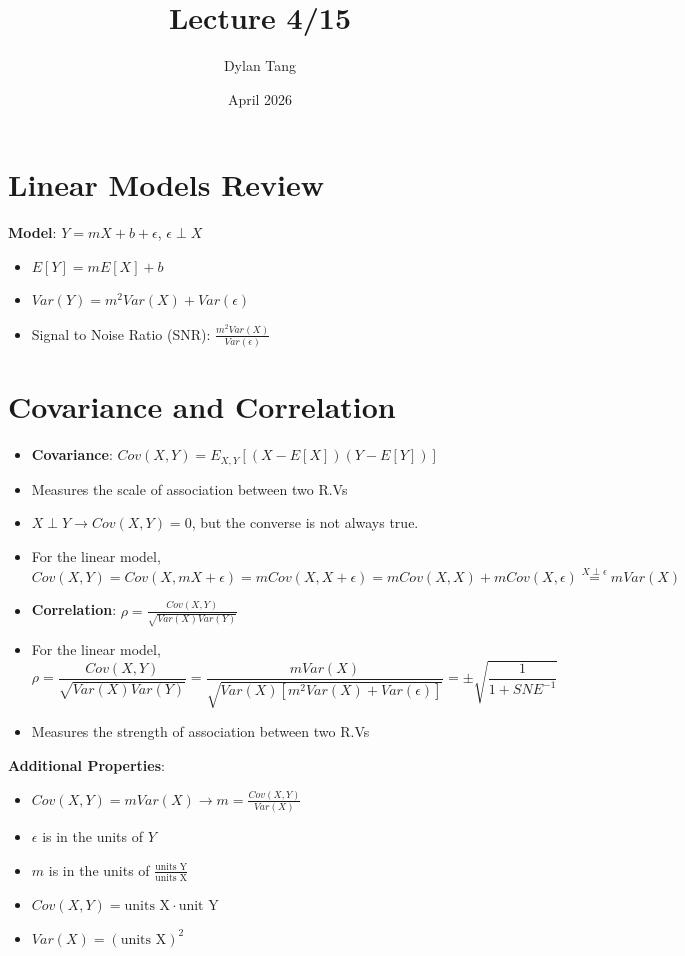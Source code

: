 \documentclass{article}
\title{Lecture 4/15}
\author{Dylan Tang}
\date{April 2026}
\begin{document}
\maketitle

\section{Linear Models Review}
\textbf{Model}: $Y = mX + b + \epsilon$, $\epsilon \perp X$
\begin{itemize}
\item $E[Y] = mE[X] + b$
\item $Var(Y) = m^2Var(X) + Var(\epsilon)$
\item Signal to Noise Ratio (SNR): $\frac{m^2Var(X)}{Var(\epsilon)}$
\end{itemize}
\section{Covariance and Correlation}
\begin{itemize}
    \item \textbf{Covariance}: $Cov(X,Y) = E_{X,Y}[(X - E[X])(Y - E[Y])]$
    \item Measures the scale of association between two R.Vs
    \item $X \perp Y \rightarrow Cov(X,Y) = 0$, but the converse is not always true.
    \item For the linear model, $Cov(X,Y) = Cov(X, mX + \epsilon) = mCov(X, X + \epsilon) = mCov(X,X) + mCov(X,\epsilon) \overset{X \perp \epsilon}{=} mVar(X)$
    \item \textbf{Correlation}: $\rho = \frac{Cov(X,Y)}{\sqrt{Var(X)Var(Y)}}$
    \item For the linear model, 
    \[
        \rho = \frac{Cov(X,Y)}{\sqrt{Var(X)Var(Y)}} = \frac{mVar(X)}{\sqrt{Var(X)[m^2Var(X) + Var(\epsilon)]}} = \pm \sqrt{\frac{1}{1 + SNE^{-1}}}
    \]
    \item Measures the strength of association between two R.Vs \\
\end{itemize}
\textbf{Additional Properties}:
\begin{itemize}
    \item $Cov(X,Y) = mVar(X) \rightarrow m = \frac{Cov(X,Y)}{Var(X)}$
    \item $\epsilon$ is in the units of $Y$
    \item $m$ is in the units of $\frac{\text{units Y}}{\text{units X}}$
    \item $Cov(X,Y) = \text{units X} \cdot \text{unit Y}$
    \item $Var(X) = (\text{units X})^2$
\end{itemize}
\end{document}
